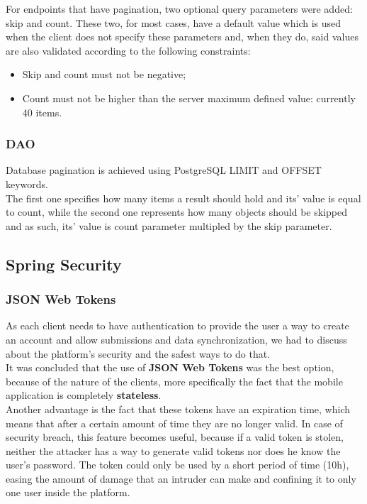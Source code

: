 For endpoints that have pagination, two optional query parameters were added: skip and count. These two, for most cases, have a
default value which is used when the client does not specify these parameters and, when they do, said values are also validated 
according to the following constraints:
\begin{itemize}
    \item Skip and count must not be negative;
    \item Count must not be higher than the server maximum defined value: currently 40 items.
\end{itemize}

\subsubsection{DAO}

Database pagination is achieved using PostgreSQL LIMIT and OFFSET keywords.\\

The first one specifies how many items a result should hold and its' value is equal to count,
while the second one represents how many objects should be skipped and as such, its' value is count
parameter multipled by the skip parameter.\\

\subsection{Spring Security}

\subsubsection{JSON Web Tokens}

As each client needs to have authentication to provide the user a way to create an account and allow submissions and data synchronization,
we had to discuss about the platform's security and the safest ways to do that.\\

It was concluded that the use of \textbf{JSON Web Tokens}\cite{jwt} was the best option, because of the nature of the clients, more specifically the fact that
the mobile application is completely \textbf{stateless}.\\

Another advantage is the fact that these tokens have an expiration time, which means that after a certain amount of time they are no longer valid.
In case of security breach, this feature becomes useful, because if a valid token is stolen, neither the attacker has a way to generate valid tokens 
nor does he know the user's password. The token could only be used by a short period of time (10h), easing the amount of damage that an intruder can
make and confining it to only one user inside the platform.\\

